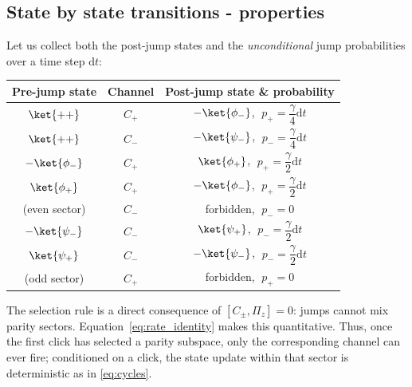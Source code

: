 \subsection{State by state transitions - properties}
Let us collect both the post-jump states and the \emph{unconditional} jump probabilities over a time step \(\mathrm{d}t\):
\begin{center}
	\renewcommand{\arraystretch}{1.3}
	\begin{tabular}{c|c|c}
		Pre-jump state & Channel & Post-jump state \& probability \\ \hline
		\(\ket{++}\) & \(C_+\) & \(-\ket{\phi_-}\), \(\;p_+=\dfrac{\gamma}{4}\mathrm{d}t\) \\
		\(\ket{++}\) & \(C_-\) & \(-\ket{\psi_-}\), \(\;p_-=\dfrac{\gamma}{4}\mathrm{d}t\) \\ \hline
		\(-\ket{\phi_-}\) & \(C_+\) & \(\ket{\phi_+}\), \(\;p_+=\dfrac{\gamma}{2}\mathrm{d}t\) \\
		\(\ket{\phi_+}\) & \(C_+\) & \(-\ket{\phi_-}\), \(\;p_+=\dfrac{\gamma}{2}\mathrm{d}t\) \\
		(even sector) & \(C_-\) & forbidden, \(\;p_-=0\) \\ \hline
		\(-\ket{\psi_-}\) & \(C_-\) & \(\ket{\psi_+}\), \(\;p_-=\dfrac{\gamma}{2}\mathrm{d}t\) \\
		\(\ket{\psi_+}\) & \(C_-\) & \(-\ket{\psi_-}\), \(\;p_-=\dfrac{\gamma}{2}\mathrm{d}t\) \\
		(odd sector) & \(C_+\) & forbidden, \(\;p_+=0\)
	\end{tabular}
\end{center}
The selection rule is a direct consequence of \([C_\pm,\Pi_z]=0\): jumps cannot mix parity sectors. Equation~\eqref{eq:rate_identity} makes this quantitative. Thus, once the first click has selected a parity subspace, only the corresponding channel can ever fire; conditioned on a click, the state update within that sector is deterministic as in \eqref{eq:cycles}.

